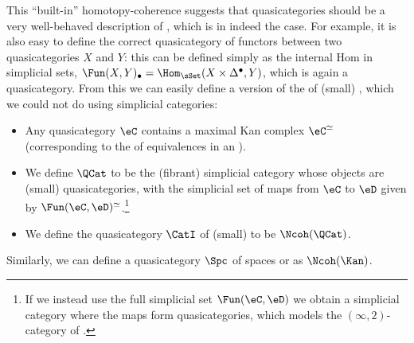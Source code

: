 \documentclass[a4paper,12pt]{article}
\begin{document}
This ``built-in'' homotopy-coherence suggests that quasicategories
should be a very well-behaved description of \icats{}, which is in
indeed the case. For example, it is also easy to define the correct
quasicategory of functors between two quasicategories $X$ and $Y$:
this can be defined simply as the internal Hom in simplicial sets,
\ie{}
$\Fun(X,Y)_{\bullet} = \Hom_{\sSet}(X \times \Delta^{\bullet}, Y)$,
which is again a quasicategory. From this we can easily define a
version of the \icat{} of (small) \icats{}, which we could not do
using simplicial categories:
\begin{itemize}
\item Any quasicategory $\eC$ contains a maximal Kan complex $\eC^{\simeq}$ (corresponding
  to the \igpd{} of equivalences in an \icat{}).
\item We define $\QCat$ to be the (fibrant) simplicial
  category whose objects are (small) quasicategories, with the
  simplicial set of maps from $\eC$ to $\eD$ given by
  $\Fun(\eC, \eD)^{\simeq}$.\footnote{If we instead use the full
    simplicial set $\Fun(\eC, \eD)$ we obtain a simplicial category
    where the maps form quasicategories, which models the
    $(\infty,2)$-category of \icats{}.}
\item We define the quasicategory $\CatI$ of (small) \icats{} to be
  $\Ncoh(\QCat)$.
\end{itemize}
Similarly, we can define a quasicategory
$\Spc$ of spaces or \igpds{} as $\Ncoh(\Kan)$.
\end{document}
